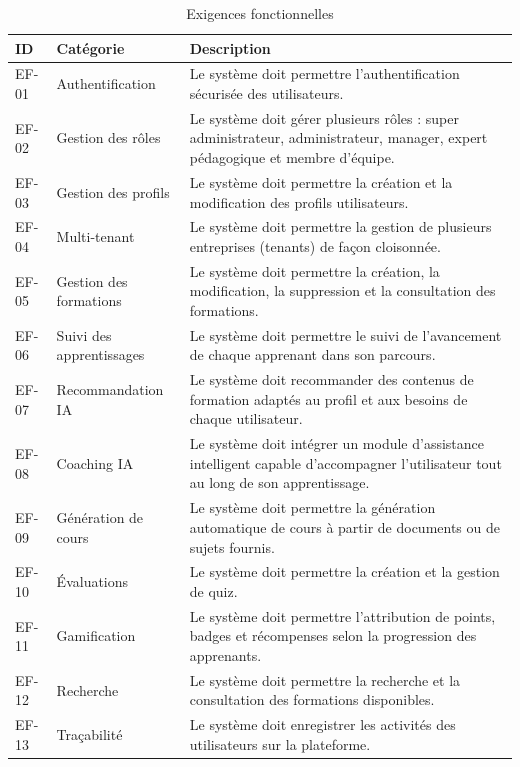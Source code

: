 \begin{table}[H]
\centering
\caption{Exigences fonctionnelles}
\label{tab:ef}
\renewcommand{\arraystretch}{1.3}
\footnotesize
\begin{tabular}{|p{1.2cm}|p{3.5cm}|p{9.5cm}|}
\hline
\textbf{ID} & \textbf{Catégorie} & \textbf{Description} \\
\hline
EF-01 & Authentification & Le système doit permettre l'authentification sécurisée des utilisateurs. \\
\hline
EF-02 & Gestion des rôles & Le système doit gérer plusieurs rôles : super administrateur, administrateur, manager, expert pédagogique et membre d'équipe. \\
\hline
EF-03 & Gestion des profils & Le système doit permettre la création et la modification des profils utilisateurs. \\
\hline
EF-04 & Multi-tenant & Le système doit permettre la gestion de plusieurs entreprises (tenants) de façon cloisonnée. \\
\hline
EF-05 & Gestion des formations & Le système doit permettre la création, la modification, la suppression et la consultation des formations. \\
\hline
EF-06 & Suivi des apprentissages & Le système doit permettre le suivi de l'avancement de chaque apprenant dans son parcours. \\
\hline
EF-07 & Recommandation IA & Le système doit recommander des contenus de formation adaptés au profil et aux besoins de chaque utilisateur. \\
\hline
EF-08 & Coaching IA & Le système doit intégrer un module d'assistance intelligent capable d'accompagner l'utilisateur tout au long de son apprentissage. \\
\hline
EF-09 & Génération de cours & Le système doit permettre la génération automatique de cours à partir de documents ou de sujets fournis. \\
\hline
EF-10 & Évaluations & Le système doit permettre la création et la gestion de quiz. \\
\hline
EF-11 & Gamification & Le système doit permettre l'attribution de points, badges et récompenses selon la progression des apprenants. \\
\hline
EF-12 & Recherche & Le système doit permettre la recherche et la consultation des formations disponibles. \\
\hline
EF-13 & Traçabilité & Le système doit enregistrer les activités des utilisateurs sur la plateforme. \\
\hline
\end{tabular}
\end{table}



